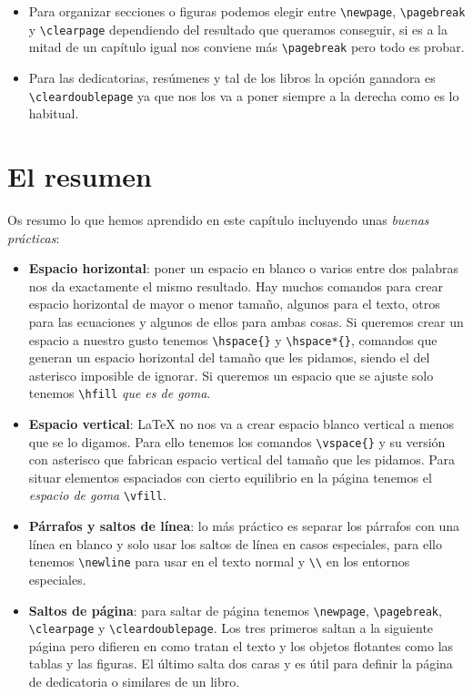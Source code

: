 \begin{itemize}
\item
  Para organizar secciones o figuras podemos elegir entre
  \lstinline!\newpage!, \lstinline!\pagebreak! y \lstinline!\clearpage!
  dependiendo del resultado que queramos conseguir, si es a la mitad de
  un capítulo igual nos conviene más \lstinline!\pagebreak! pero todo es
  probar.
\item
  Para las dedicatorias, resúmenes y tal de los libros la opción
  ganadora es \lstinline!\cleardoublepage! ya que nos los va a poner
  siempre a la derecha como es lo habitual.
\end{itemize}

\section{El resumen}

Os resumo lo que hemos aprendido en este capítulo incluyendo unas
\emph{buenas prácticas}:

\begin{itemize}
\item
  \textbf{Espacio horizontal}: poner un espacio en blanco o varios entre
  dos palabras nos da exactamente el mismo resultado. Hay muchos
  comandos para crear espacio horizontal de mayor o menor tamaño,
  algunos para el texto, otros para las ecuaciones y algunos de ellos
  para ambas cosas. Si queremos crear un espacio a nuestro gusto tenemos
  \lstinline!\hspace{}! y \lstinline!\hspace*{}!, comandos que generan
  un espacio horizontal del tamaño que les pidamos, siendo el del
  asterisco imposible de ignorar. Si queremos un espacio que se ajuste
  solo tenemos \lstinline!\hfill! \emph{que es de goma}.
\item
  \textbf{Espacio vertical}: LaTeX no nos va a crear espacio blanco
  vertical a menos que se lo digamos. Para ello tenemos los comandos
  \lstinline!\vspace{}! y su versión con asterisco que fabrican espacio
  vertical del tamaño que les pidamos. Para situar elementos espaciados
  con cierto equilibrio en la página tenemos el \emph{espacio de goma}
  \lstinline!\vfill!.
\item
  \textbf{Párrafos y saltos de línea}: lo más práctico es separar los
  párrafos con una línea en blanco y solo usar los saltos de línea en
  casos especiales, para ello tenemos \lstinline!\newline! para usar en
  el texto normal y \lstinline!\\! en los entornos especiales.
\item
  \textbf{Saltos de página}: para saltar de página tenemos
  \lstinline!\newpage!, \lstinline!\pagebreak!, \lstinline!\clearpage! y
  \lstinline!\cleardoublepage!. Los tres primeros saltan a la siguiente
  página pero difieren en como tratan el texto y los objetos flotantes
  como las tablas y las figuras. El último salta dos caras y es útil
  para definir la página de dedicatoria o similares de un libro.
\end{itemize}

